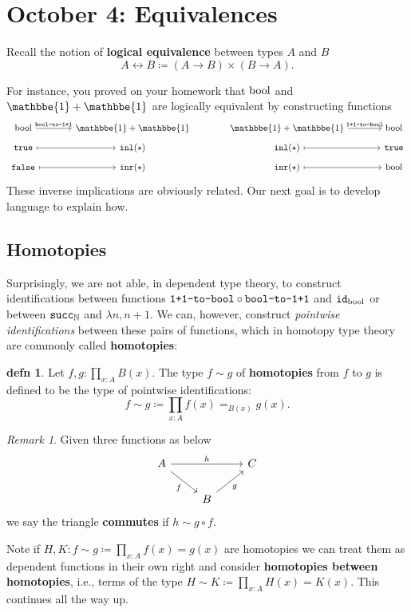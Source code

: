 \documentclass{amsart}
\theoremstyle{theorem}
\theoremstyle{definition}
\newtheorem*{defn}{defn}
\theoremstyle{remark}
\newtheorem*{rmk}{Remark}
\newcommand{\0}{\mathbbe{0}}
\newcommand{\1}{\mathbbe{1}}
\newcommand{\2}{\mathbbe{2}}
\newcommand{\3}{\mathbbe{3}}
\newcommand{\4}{\mathbbe{4}}
\newcommand{\term}[1]{{\textup{\texttt{#1}}}}
\newcommand{\type}[1]{{\textup{#1}}}
\newcommand{\id}{\term{id}}
\newcommand{\bN}{{\mathbb{N}}}
\newcommand{\suc}{\term{succ}_{\bN}}
\newcommand{\inl}{\term{inl}}
\newcommand{\inr}{\term{inr}}
\newcommand{\bool}{\type{bool}}
\newcommand{\true}{\term{true}}
\newcommand{\false}{\term{false}}
\begin{document}
\section*{October 4: Equivalences}

Recall the notion of \textbf{logical equivalence} between types $A$ and $B$
\[ A \leftrightarrow B \coloneq (A \to B) \times (B \to A).\]

For instance, you proved on your homework that $\bool$ and $\1+\1$ are logically equivalent by constructing functions
\[
\begin{tikzcd}[row sep=tiny, column sep=large] \bool \arrow[r, "{\term{bool-to-1+1}}"] & \1+\1 & \1+\1 \arrow[r, "\term{1+1-to-bool}"] & \bool \\
\true \arrow[r, mapsto] & \inl(\star) & \inl(\star) \arrow[r, mapsto] & \true \\ \false \arrow[r, mapsto] & \inr(\star) & \inr(\star) \arrow[r, mapsto] & \bool
\end{tikzcd}
\]
These inverse implications are obviously related. Our next goal is to develop language to explain how.

\subsection*{Homotopies}

Surprisingly, we are not able, in dependent type theory, to construct identifications between functions $\term{1+1-to-bool} \circ \term{bool-to-1+1}$ and $\id_\bool$ or between $\suc$ and $\lambda n, n+1$. We can, however, construct \emph{pointwise identifications} between these pairs of functions, which in homotopy type theory are commonly called \textbf{homotopies}:

\begin{defn} Let $f,g : \prod_{x:A} B(x)$. The type $f\sim g$ of \textbf{homotopies} from $f$ to $g$ is defined to be the type of pointwise identifications:
\[ f \sim g\coloneq \prod_{x :A} f(x) =_{B(x)} g(x).\]
\end{defn}

\begin{rmk} Given three functions as below
\[
\begin{tikzcd} A \arrow[rr, "h"] \arrow[dr, "f"'] & & C \\ & B \arrow[ur, "g"']
\end{tikzcd}
\]
we say the triangle \textbf{commutes} if $h\sim g \circ f$.
\end{rmk}

Note if $H, K : f \sim g \coloneq \prod_{x :A} f(x) = g(x)$ are homotopies we can treat them as dependent functions in their own right and consider \textbf{homotopies between homotopies}, i.e., terms of the type $H \sim K \coloneq \prod_{x :A} H(x) = K(x)$. This continues all the way up.
\end{document}
